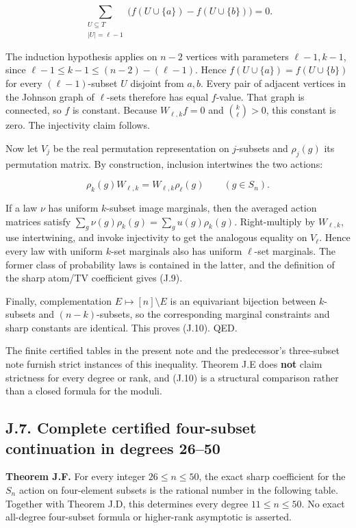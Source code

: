 \documentclass[
  11pt,
]{article}
\begin{document}
\[
\sum_{\substack{U\subseteq T\\|U|=\ell-1}}
\bigl(f(U\cup\{a\})-f(U\cup\{b\})\bigr)=0.
\]

The induction hypothesis applies on \(n-2\) vertices with parameters
\(\ell-1,k-1\), since \(\ell-1\le k-1\le(n-2)-(\ell-1)\). Hence
\(f(U\cup\{a\})=f(U\cup\{b\})\) for every \((\ell-1)\)-subset \(U\)
disjoint from \(a,b\). Every pair of adjacent vertices in the Johnson
graph of \(\ell\)-sets therefore has equal \(f\)-value. That graph is
connected, so \(f\) is constant. Because \(W_{\ell,k}f=0\) and
\(\binom{k}{\ell}>0\), this constant is zero. The injectivity claim
follows.

Now let \(V_j\) be the real permutation representation on \(j\)-subsets
and \(\rho_j(g)\) its permutation matrix. By construction, inclusion
intertwines the two actions:

\[
\rho_k(g)W_{\ell,k}=W_{\ell,k}\rho_\ell(g)\qquad(g\in S_n).
\]

If a law \(\nu\) has uniform \(k\)-subset image marginals, then the
averaged action matrices satisfy
\(\sum_g\nu(g)\rho_k(g)=\sum_gu(g)\rho_k(g)\). Right-multiply by
\(W_{\ell,k}\), use intertwining, and invoke injectivity to get the
analogous equality on \(V_\ell\). Hence every law with uniform \(k\)-set
marginals also has uniform \(\ell\)-set marginals. The former class of
probability laws is contained in the latter, and the definition of the
sharp atom/TV coefficient gives (J.9).

Finally, complementation \(E\mapsto[n]\setminus E\) is an equivariant
bijection between \(k\)-subsets and \((n-k)\)-subsets, so the
corresponding marginal constraints and sharp constants are identical.
This proves (J.10). QED.

The finite certified tables in the present note and the predecessor's
three-subset note furnish strict instances of this inequality. Theorem
J.E does \textbf{not} claim strictness for every degree or rank, and
(J.10) is a structural comparison rather than a closed formula for the
moduli.

\subsection{J.7. Complete certified four-subset continuation in degrees
26--50}\label{j.7.-complete-certified-four-subset-continuation-in-degrees-2650}

\textbf{Theorem J.F.} For every integer \(26\le n\le50\), the exact
sharp coefficient for the \(S_n\) action on four-element subsets is the
rational number in the following table. Together with Theorem J.D, this
determines every degree \(11\le n\le50\). No exact all-degree
four-subset formula or higher-rank asymptotic is asserted.
\end{document}
